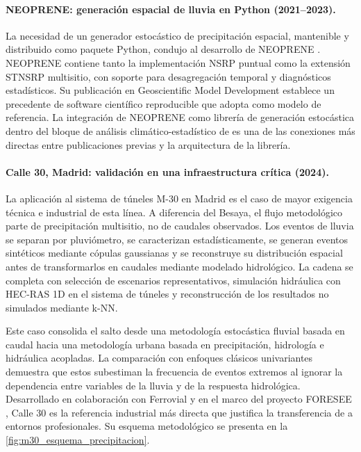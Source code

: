 \paragraph{NEOPRENE: generación espacial de lluvia en Python (2021--2023).}
La necesidad de un generador estocástico de precipitación espacial, mantenible y distribuido como paquete Python, condujo al desarrollo de NEOPRENE \parencite{diezsierra2023neoprene}. NEOPRENE contiene tanto la implementación NSRP puntual como la extensión STNSRP multisitio, con soporte para desagregación temporal y diagnósticos estadísticos. Su publicación en Geoscientific Model Development establece un precedente de software científico reproducible que \hydra adopta como modelo de referencia. La integración de NEOPRENE como librería de generación estocástica dentro del bloque de análisis climático-estadístico de \pyhydra es una de las conexiones más directas entre publicaciones previas y la arquitectura de la librería.

\paragraph{Calle 30, Madrid: validación en una infraestructura crítica (2024).}
La aplicación al sistema de túneles M-30 en Madrid \parencite{navas2024calle30} es el caso de mayor exigencia técnica e industrial de esta línea. A diferencia del Besaya, el flujo metodológico parte de precipitación multisitio, no de caudales observados. Los eventos de lluvia se separan por pluviómetro, se caracterizan estadísticamente, se generan eventos sintéticos mediante cópulas gaussianas y se reconstruye su distribución espacial antes de transformarlos en caudales mediante modelado hidrológico. La cadena se completa con selección de escenarios representativos, simulación hidráulica con HEC-RAS 1D en el sistema de túneles y reconstrucción de los resultados no simulados mediante k-NN.

Este caso consolida el salto desde una metodología estocástica fluvial basada en caudal hacia una metodología urbana basada en precipitación, hidrología e hidráulica acopladas. La comparación con enfoques clásicos univariantes demuestra que estos subestiman la frecuencia de eventos extremos al ignorar la dependencia entre variables de la lluvia y de la respuesta hidrológica. Desarrollado en colaboración con Ferrovial y en el marco del proyecto FORESEE \parencite{ihcantabria2020foresee,ihcantabria2021m30}, Calle 30 es la referencia industrial más directa que justifica la transferencia de \hydra a entornos profesionales. Su esquema metodológico se presenta en la \cref{fig:m30_esquema_precipitacion}.


